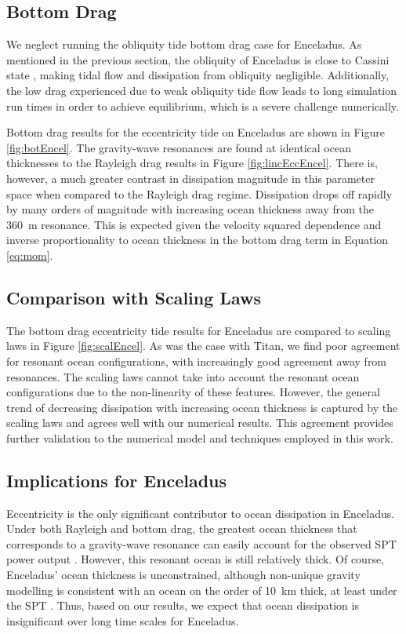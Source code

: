 \subsection{Bottom Drag}

We neglect running the obliquity tide bottom drag case for Enceladus. As mentioned in the previous section, the obliquity of Enceladus is close to Cassini state \citep{chen2011obliquity,baland2016obliquity}, making tidal flow and dissipation from obliquity negligible. Additionally, the low drag experienced due to weak obliquity tide flow leads to long simulation run times in order to achieve equilibrium, which is a severe challenge numerically.

Bottom drag results for the eccentricity tide on Enceladus are shown in Figure \ref{fig:botEncel}. The gravity-wave resonances are found at identical ocean thicknesses to the Rayleigh drag results in Figure \ref{fig:lincEccEncel}. There is, however, a much greater contrast in dissipation magnitude in this parameter space when compared to the Rayleigh drag regime. Dissipation drops off rapidly by many orders of magnitude with increasing ocean thickness away from the \SI{360}{\metre} resonance. This is expected given the velocity squared dependence and inverse proportionality to ocean thickness in the bottom drag term in Equation \ref{eq:mom}. 

\subsection{Comparison with Scaling Laws}

The bottom drag eccentricity tide results for Enceladus are compared to \citet{chen2013tidal} scaling laws in Figure \ref{fig:scalEncel}. As was the case with Titan, we find poor agreement for resonant ocean configurations, with increasingly good agreement away from resonances. The scaling laws cannot take into account the resonant ocean configurations due to the non-linearity of these features. However, the general trend of decreasing dissipation with increasing ocean thickness is captured by the scaling laws and agrees well with our numerical results. This agreement provides further validation to the numerical model and techniques employed in this work.

\subsection{Implications for Enceladus}

Eccentricity is the only significant contributor to ocean dissipation in Enceladus. Under both Rayleigh and bottom drag, the greatest ocean thickness that corresponds to a gravity-wave resonance can easily account for the observed SPT power output \citep{spencer2006cassini,howett2011high,spencer2013new}. However, this resonant ocean is still relatively thick. Of course, Enceladus' ocean thickness is unconstrained, although non-unique gravity modelling is consistent with an ocean on the order of \SI{10}{\kilo\metre} thick, at least under the SPT \citep{iess2014gravity}. Thus, based on our results, we expect that ocean dissipation is insignificant over long time scales for Enceladus. 

